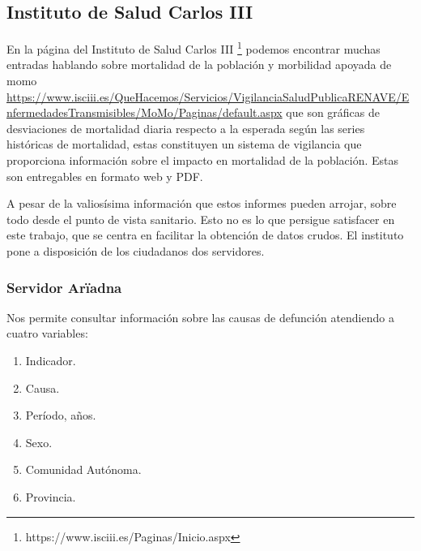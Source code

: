 \subsection{Instituto de Salud Carlos III}
En la página del Instituto de Salud Carlos III \footnote{https://www.isciii.es/Paginas/Inicio.aspx} podemos encontrar muchas entradas  hablando sobre \Gls{mortalidad} de la población y \Gls{morbilidad} apoyada de \Gls{momo} \href{Instituto de Salud Carlos III - Vigilancia de la Mortalidad Diaria}{https://www.isciii.es/QueHacemos/Servicios/VigilanciaSaludPublicaRENAVE/EnfermedadesTransmisibles/MoMo/Paginas/default.aspx} que son gráficas de desviaciones de mortalidad diaria respecto a la esperada según las series históricas de mortalidad, estas constituyen un sistema de vigilancia que proporciona información sobre el impacto en mortalidad de la población. Estas son entregables en formato web y PDF.

A pesar de la valiosísima información que estos informes pueden arrojar, sobre todo desde el punto de vista sanitario. Esto no es lo que persigue satisfacer en este trabajo, que se centra en facilitar la obtención de datos crudos. El instituto pone a disposición de los ciudadanos dos servidores.

\subsubsection{Servidor Arïadna}
Nos permite consultar información sobre las causas de defunción atendiendo a cuatro variables:
\begin{enumerate}
  \item Indicador.
  \item Causa.
  \item Período, años.
  \item Sexo.
  \item Comunidad Autónoma.
  \item Provincia.
\end{enumerate}

